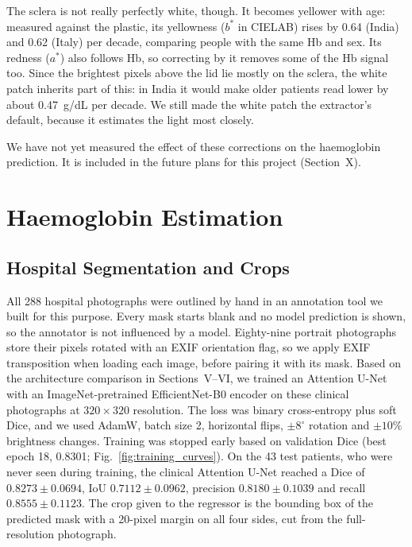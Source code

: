 \documentclass[conference]{IEEEtran}
\begin{document}
The sclera is not really perfectly white, though. It becomes yellower with age:
measured against the plastic, its yellowness ($b^*$ in CIELAB) rises by 0.64
(India) and 0.62 (Italy) per decade, comparing people with the same Hb and sex.
Its redness ($a^*$) also follows Hb, so correcting by it removes some of the Hb
signal too. Since the brightest pixels above the lid lie mostly on the sclera,
the white patch inherits part of this: in India it would make older patients
read lower by about 0.47~g/dL per decade. We still made the white patch the
extractor's default, because it estimates the light most closely.

We have not yet measured the effect of these corrections on the haemoglobin
prediction. It is included in the future plans for this project (Section~X).

\section{Haemoglobin Estimation}
\subsection{Hospital Segmentation and Crops}
All 288 hospital photographs were outlined by hand in an annotation tool we
built for this purpose. Every mask starts blank and no model prediction is
shown, so the annotator is not influenced by a model. Eighty-nine portrait
photographs store their pixels rotated with an EXIF orientation flag, so we
apply EXIF transposition when loading each image, before pairing it with its
mask.
Based on the architecture comparison in Sections~V--VI, we trained an Attention
U-Net with an ImageNet-pretrained EfficientNet-B0 encoder on these clinical
photographs at $320 \times 320$ resolution. The loss was binary cross-entropy
plus soft Dice, and we used AdamW, batch size 2, horizontal flips, $\pm
8^\circ$ rotation and $\pm 10\%$ brightness changes. Training was stopped early
based on validation Dice (best epoch 18, 0.8301; Fig.~\ref{fig:training_curves}).
On the 43 test patients, who were never seen during training, the clinical
Attention U-Net reached a Dice of $0.8273 \pm 0.0694$, IoU $0.7112 \pm 0.0962$,
precision $0.8180 \pm 0.1039$ and recall $0.8555 \pm 0.1123$.
The crop given to the regressor is the bounding box of the predicted mask with a
20-pixel margin on all four sides, cut from the full-resolution photograph.
\end{document}
